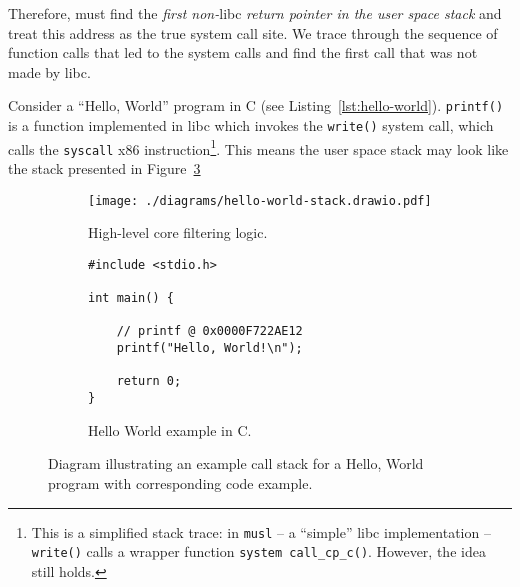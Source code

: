 Therefore, \af must find the \textit{first non-}\ac{libc} \textit{return pointer in the
user space stack} and treat this address as the true system call site. 
We trace through the sequence of function calls that led to the system
calls and find the first call that was not made by \ac{libc}.

Consider a ``Hello, World'' program in C (see Listing~\ref{lst:hello-world}). \texttt{printf()} is a 
function implemented in \ac{libc} which invokes the \texttt{write()} system call,
which calls the \texttt{syscall} x86
instruction\footnote{This is a simplified stack trace: in \texttt{musl} -- a
    ``simple'' \ac{libc} implementation --
\texttt{write()} calls a wrapper function \texttt{system call\_cp\_c()}. However,
the idea still holds.}. This means the user space stack may look like the stack
presented in Figure~\ref{fig:hello-world-stack}

\begin{figure}[h]
    \centering %

    \begin{subfigure}[b]{0.48\linewidth} %
        \centering %
        \texttt{[image: ./diagrams/hello-world-stack.drawio.pdf]}
        \caption{High-level \afg core filtering logic.} 
        \label{subfig:stack-diagram} %
    \end{subfigure}
    \hfill %
    \begin{subfigure}[b]{0.48\linewidth} %
        \centering %
        \begin{verbatim}
#include <stdio.h>

int main() {

    // printf @ 0x0000F722AE12
    printf("Hello, World!\n");    

    return 0;
}
        \end{verbatim}
        \caption{Hello World example in C.} %
        \label{subfig:hello-world-code} %
    \end{subfigure}

    \caption{Diagram illustrating an example call stack for a Hello, World
    program with corresponding code example.}%
    \label{fig:hello-world-stack} %

\end{figure}

